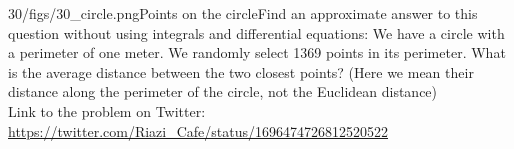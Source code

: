 \begin{problem}{30/figs/30_circle.png}{Points on the circle}Find an approximate answer to this question without using integrals and differential equations:
We have a circle with a perimeter of one meter. We randomly select 1369 points in its perimeter. What is the average distance between the two closest points? (Here we mean their distance along the perimeter of the circle, not the Euclidean distance)\\[0.2cm]

Link to the problem on Twitter:  \url{https://twitter.com/Riazi_Cafe/status/1696474726812520522}\end{problem}